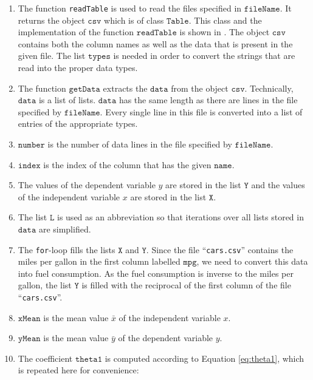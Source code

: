 \begin{enumerate}
\item The function \texttt{readTable} is used to read the files specified in $\mathtt{fileName}$.
      It returns the object $\mathtt{csv}$ which is of class $\mathtt{Table}$.  This class and the implementation of the function
      $\mathtt{readTable}$ is shown in .  The object $\mathtt{csv}$ contains both the column
      names as well as the data that is present in the given file.  The list $\mathtt{types}$ is needed in
      order to convert the strings that are read into the proper data types.
\item The function $\mathtt{getData}$ extracts the $\mathtt{data}$ from the object $\mathtt{csv}$.
      Technically, $\mathtt{data}$ is a list of lists.  $\mathtt{data}$ has the same length as there are lines
      in the file specified by $\mathtt{fileName}$. Every single line in this file is converted
      into a list of entries of the appropriate types.
\item $\mathtt{number}$ is the number of data lines in the file specified by $\mathtt{fileName}$.
\item $\mathtt{index}$ is the index of the column that has the given $\mathtt{name}$.
\item The values of the dependent variable $y$ are stored in the list $\mathtt{Y}$ and the values of the
      independent variable $x$ are stored in the list $\mathtt{X}$.
\item The list $\mathtt{L}$ is used as an abbreviation so that iterations over all lists stored in
      $\mathtt{data}$ are simplified.
\item The \texttt{for}-loop fills the lists $\mathtt{X}$ and $\mathtt{Y}$.  Since the file
      ``\texttt{cars.csv}'' contains the miles per gallon in the first column labelled $\mathtt{mpg}$,
      we need to convert this data into fuel consumption.  As the fuel consumption is inverse to the miles per
      gallon, the list $\mathtt{Y}$ is filled with the reciprocal of the first column of the file
      ``\texttt{cars.csv}''. 
\item $\mathtt{xMean}$ is the mean value $\bar{x}$ of the independent variable $x$.
\item $\mathtt{yMean}$ is the mean value $\bar{y}$ of the dependent variable $y$. 
\item The coefficient $\mathtt{theta1}$ is computed according to Equation \ref{eq:theta1}, which is repeated
      here for convenience:
      \\[0.2cm]

\end{enumerate}
